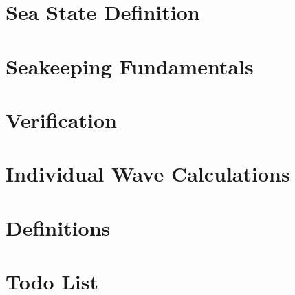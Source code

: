 \documentclass{book}
\begin{document}
\chapter{Sea State Definition}
\label{sea_state_definition}
\hypertarget{sea_state_definition}{}

\chapter{Seakeeping Fundamentals}
\label{seakeeping_fundamentals}
\hypertarget{seakeeping_fundamentals}{}

\chapter{Verification}
\label{verification}
\hypertarget{verification}{}

\chapter{Individual Wave Calculations}
\label{wave_calculation}
\hypertarget{wave_calculation}{}

\chapter{Definitions}
\label{definitions}
\hypertarget{definitions}{}

\chapter{Todo List}
\label{todo}
\hypertarget{todo}{}

\printindex
\end{document}
